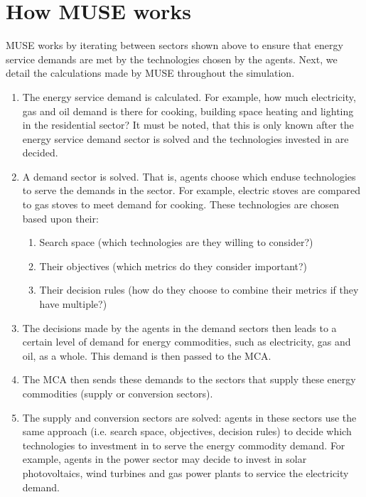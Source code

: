\documentclass[letterpaper,10pt,english]{sphinxmanual}
\begin{document}
\section{How MUSE works}
\label{\detokenize{overview:how-muse-works}}
MUSE works by iterating between sectors shown above to ensure that energy service demands are met by the technologies chosen by the agents. Next, we detail the calculations made by MUSE throughout the simulation.
\begin{enumerate}
%
\item {} 
The energy service demand is calculated. For example, how much electricity, gas and oil demand is there for cooking, building space heating and lighting in the residential sector? It must be noted, that this is only known after the energy service demand sector is solved and the technologies invested in are decided.

\item {} 
A demand sector is solved. That is, agents choose which end\sphinxhyphen{}use technologies to serve the demands in the sector. For example, electric stoves are compared to gas stoves to meet demand for cooking. These technologies are chosen based upon their:
\begin{enumerate}
%
\item {} 
Search space (which technologies are they willing to consider?)

\item {} 
Their objectives (which metrics do they consider important?)

\item {} 
Their decision rules (how do they choose to combine their metrics if they have multiple?)

\end{enumerate}

\item {} 
The decisions made by the agents in the demand sectors then leads to a certain level of demand for energy commodities, such as electricity, gas and oil, as a whole. This demand is then passed to the MCA.

\item {} 
The MCA then sends these demands to the sectors that supply these energy commodities (supply or conversion sectors).

\item {} 
The supply and conversion sectors are solved: agents in these sectors use the same approach (i.e. search space, objectives, decision rules) to decide which technologies to investment in to serve the energy commodity demand. For example, agents in the power sector may decide to invest in solar photovoltaics, wind turbines and gas power plants to service the electricity demand.


\end{enumerate}
\end{document}
